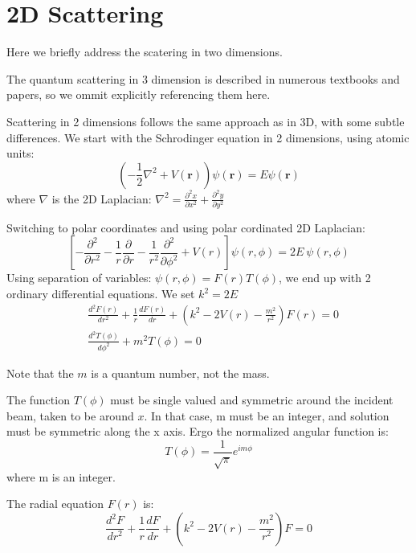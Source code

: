 \chapter{2D Scattering}

  Here we briefly address the scatering in two dimensions.

  The quantum scattering in 3 dimension is described in numerous textbooks and papers, so we ommit explicitly referencing them here.

  Scattering in 2 dimensions follows the same approach as in 3D, with some subtle differences.
  We start with the Schrodinger equation in 2 dimensions, using atomic units:
  \begin{equation}\label{2DS1}
      \left(-\frac{1}{2}\nabla^2 + V(\mathbf{r})\right)\psi(\mathbf{r}) = E\psi(\mathbf{r})
  \end{equation}
  where $ \nabla $ is the 2D Laplacian: $ \nabla^2 = \frac{\partial^2 x}{\partial x^2} + \frac{\partial^2 y}{\partial y^2} $

  Switching to polar coordinates and using polar cordinated 2D Laplacian:
  \begin{equation}
      \left[-\frac{\partial^2}{\partial r^2} - \frac{1}{r}\frac{\partial}{\partial r} - \frac{1}{r^2}\frac{\partial^2}{\partial\phi^2} + V(r)\right]\psi(r,\phi) = 2E\ \psi(r,\phi)
  \end{equation}
  Using separation of variables: $ \psi(r,\phi) = F(r)T(\phi) $, we end up with 2 ordinary differential equations. We set $ k^2 = 2E $
  \begin{equation}
  \begin{split}
   & \frac{d^2F(r)}{d r^2} +\frac{1}{r}\frac{d F(r)}{d r} +(k^2 -  2V(r) - \frac{m^2}{r^2})F(r) = 0\\[.8em]
   & \frac{d^2 T(\phi)}{d \phi^2} + m^2 T(\phi) = 0
  \end{split}
  \end{equation}

  Note that the $ m $ is a quantum number, not the mass. 

  The function $ T(\phi) $ must be single valued and symmetric around the incident beam, taken to be around $ x $. In that case, m must be an integer, and solution must be symmetric along the x axis. Ergo the normalized angular function is:
  \begin{equation}
T(\phi) = \frac{1}{\sqrt{\pi}}e^{i m\phi}
\end{equation}
where m is an integer.

The radial equation $ F(r) $ is:
\begin{equation}\label{frr}
\frac{d^2 F}{dr^2} + \frac{1}{r}\frac{dF}{dr} + \left(k^2 - 2V(r) - \frac{m^2}{r^2}\right)F = 0
\end{equation}

